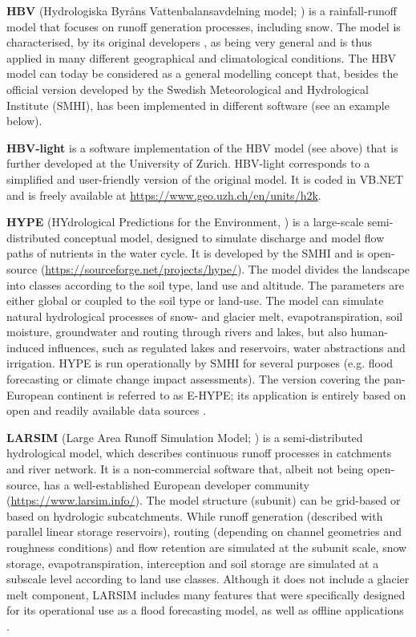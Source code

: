 \documentclass[10pt,a4paper]{article}
\begin{document}
\textbf{HBV} (Hydrologiska Byråns Vattenbalansavdelning model; \citealp{Bergstrom1976a, Bergstrom1992, Bergstrom1995, Lindstrm1997})  is a rainfall-runoff model that focuses on runoff generation processes, including snow. The model is characterised, by its original developers \citep{Bergstrom1992}, as being very general and is thus applied in many different geographical and climatological conditions. The HBV model can today be considered as a general modelling concept that, besides the official version developed by the Swedish Meteorological and Hydrological Institute (SMHI), has been implemented in different software (see an example below).

\textbf{HBV-light} \citep{Seibert2012} is a software implementation of the HBV model (see above) that is further developed at the University of Zurich. HBV-light corresponds to a simplified and user-friendly version of the original model. It is coded in VB.NET and is freely available at \url{https://www.geo.uzh.ch/en/units/h2k}.

\textbf{HYPE} (HYdrological Predictions for the Environment, \citealp{Lindstrom2010}) is a large-scale semi-distributed conceptual model, designed to simulate discharge and model flow paths of nutrients in the water cycle. It is developed by the SMHI and is open-source (\url{https://sourceforge.net/projects/hype/}). The model divides the landscape into classes according to the soil type, land use and altitude. The parameters are either global or coupled to the soil type or land-use. The model can simulate natural hydrological processes of snow- and glacier melt, evapotranspiration, soil moisture, groundwater and routing through rivers and lakes, but also human-induced influences, such as regulated lakes and reservoirs, water abstractions and irrigation. HYPE is run operationally by SMHI for several purposes (e.g. flood forecasting or climate change impact assessments). The version covering the pan-European continent is referred to as E-HYPE; its application is entirely based on open and readily available data sources \citep[][ \url{https://hypeweb.smhi.se/explore-water/geographical-domains/\#europehype}]{Donnelly2015}.

\textbf{LARSIM} (Large Area Runoff Simulation Model; \citealp{Ludwig2006}) is a semi-distributed hydrological model, which describes continuous runoff processes in catchments and river network. It is a non-commercial software that, albeit not being open-source, has a well-established European developer community (\url{https://www.larsim.info/}). The model structure (subunit) can be grid-based or based on hydrologic subcatchments. While runoff generation (described with parallel linear storage reservoirs), routing (depending on channel geometries and roughness conditions) and flow retention are simulated at the subunit scale, snow storage, evapotranspiration, interception and soil storage are simulated at a subscale level according to land use classes. Although it does not include a glacier melt component, LARSIM includes many features that were specifically designed for its operational use as a flood forecasting model, as well as offline applications \citep{Stahl2017}. 
\end{document}
